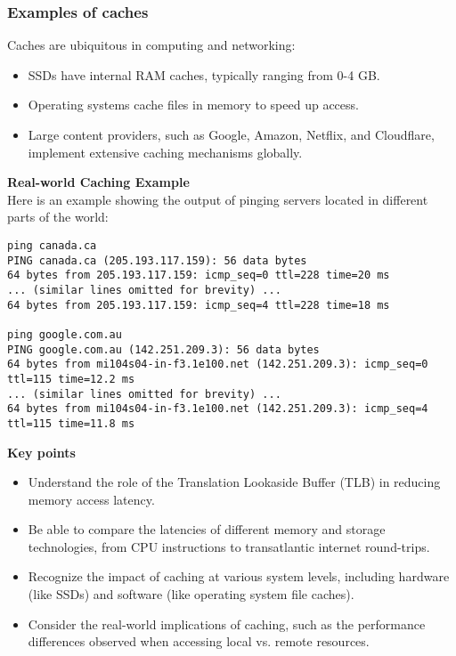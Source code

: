 \documentclass[12pt]{article}
\begin{document}
\subsubsection{Examples of caches}
Caches are ubiquitous in computing and networking:

\begin{itemize}
    \item SSDs have internal RAM caches, typically ranging from 0-4 GB.
    \item Operating systems cache files in memory to speed up access.
    \item Large content providers, such as Google, Amazon, Netflix, and Cloudflare, implement extensive caching mechanisms globally.
\end{itemize}

\textbf{Real-world Caching Example}\\
Here is an example showing the output of pinging servers located in different parts of the world:

\begin{lstlisting}
ping canada.ca
PING canada.ca (205.193.117.159): 56 data bytes
64 bytes from 205.193.117.159: icmp_seq=0 ttl=228 time=20 ms
... (similar lines omitted for brevity) ...
64 bytes from 205.193.117.159: icmp_seq=4 ttl=228 time=18 ms

ping google.com.au
PING google.com.au (142.251.209.3): 56 data bytes
64 bytes from mi104s04-in-f3.1e100.net (142.251.209.3): icmp_seq=0 ttl=115 time=12.2 ms
... (similar lines omitted for brevity) ...
64 bytes from mi104s04-in-f3.1e100.net (142.251.209.3): icmp_seq=4 ttl=115 time=11.8 ms
\end{lstlisting}

\textbf{Key points}
\begin{itemize}
    \item Understand the role of the Translation Lookaside Buffer (TLB) in reducing memory access latency.
    \item Be able to compare the latencies of different memory and storage technologies, from CPU instructions to transatlantic internet round-trips.
    \item Recognize the impact of caching at various system levels, including hardware (like SSDs) and software (like operating system file caches).
    \item Consider the real-world implications of caching, such as the performance differences observed when accessing local vs. remote resources.
\end{itemize}
\end{document}
